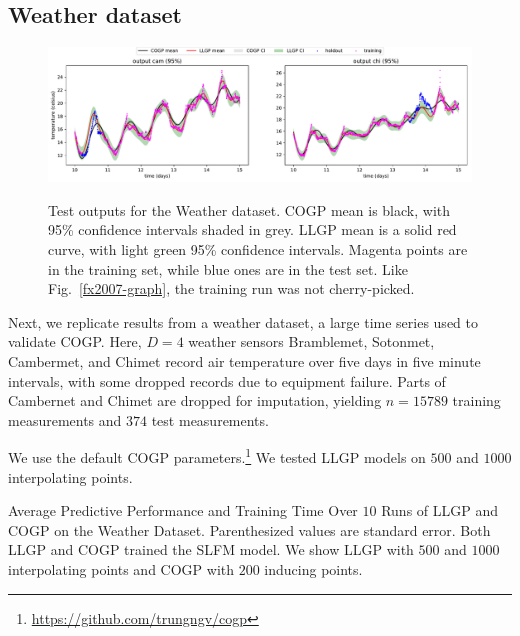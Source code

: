 \documentclass[twoside]{article}
\begin{document}
\subsection{Weather dataset}\label{large-bench}


\begin{figure}[!ht]
\centering
{\includegraphics[width=\textwidth]{weather.pdf}}
\caption{Test outputs for the Weather dataset. COGP mean is black, with 95\% confidence intervals shaded in grey. LLGP mean is a solid red curve, with light green 95\% confidence intervals. Magenta points are in the training set, while blue ones are in the test set. Like Fig.~\ref{fx2007-graph}, the training run was not cherry-picked.}
\label{weather-fig}
\end{figure}

Next, we replicate results from a weather dataset, a large time series used to validate COGP. Here, $D=4$ weather sensors Bramblemet, Sotonmet, Cambermet, and Chimet record air temperature over five days in five minute intervals, with some dropped records due to equipment failure. Parts of Cambernet and Chimet are dropped for imputation, yielding $n=15789$ training measurements and $374$ test measurements. 

We use the default COGP parameters.\footnote{\url{https://github.com/trungngv/cogp}} We tested LLGP models on $500$ and $1000$ interpolating points.

\begin{table}[!htbp]
  \caption{Average Predictive Performance and Training Time Over $10$ Runs of LLGP and COGP on the Weather Dataset. Parenthesized values are standard error. Both LLGP and COGP trained the SLFM model. We show LLGP with $500$ and $1000$ interpolating points and COGP with $200$ inducing points.}
\label{weather-tbl}
\begin{center}
  \begin{small}
    \begin{sc}
      
\end{sc}
\end{small}
\end{center}

\end{table}
\end{document}
